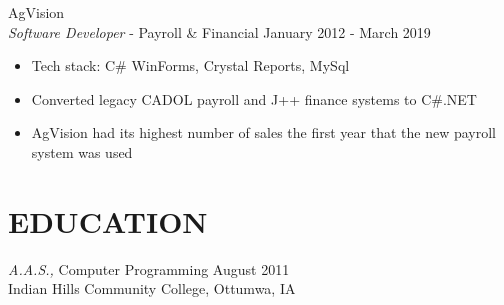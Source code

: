 \documentclass[line,margin]{res}
\begin{document}
\begin{resume}
\begin{itemize}
	\end{itemize}
	AgVision \\
	{\sl Software Developer} - Payroll \& Financial \hfill January 2012 - March 2019
	\begin{itemize} 
		\item Tech stack: C\# WinForms, Crystal Reports, MySql
		\item Converted legacy CADOL payroll and J++ finance systems to C\#.NET
		\item AgVision had its highest number of sales the first year that the new payroll system was used
	\end{itemize}
           
\section{EDUCATION} {\sl A.A.S.,} Computer Programming \hfill August 2011 \\
Indian Hills Community College, Ottumwa, IA

\end{resume}
\end{document}
